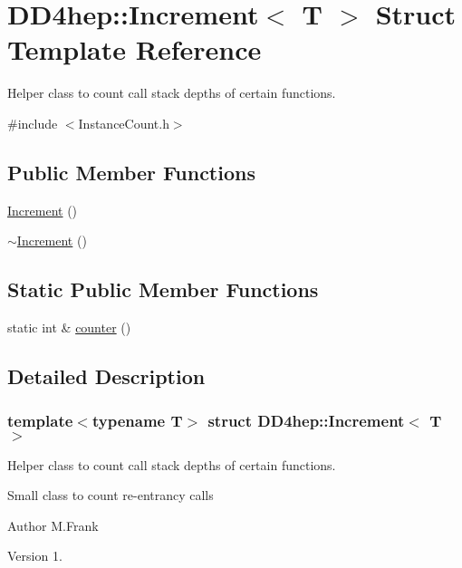 \hypertarget{struct_d_d4hep_1_1_increment}{}\section{D\+D4hep\+:\+:Increment$<$ T $>$ Struct Template Reference}
\label{struct_d_d4hep_1_1_increment}


Helper class to count call stack depths of certain functions.  




{\ttfamily \#include $<$Instance\+Count.\+h$>$}

\subsection*{Public Member Functions}
\begin{DoxyCompactItemize}
\item 
\hyperlink{struct_d_d4hep_1_1_increment_a50a4d78633dc0e8b3eca298c9e09bbb8}{Increment} ()
\item 
\hyperlink{struct_d_d4hep_1_1_increment_ad2148abb952e3dbd20b46c081851affc}{$\sim$\+Increment} ()
\end{DoxyCompactItemize}
\subsection*{Static Public Member Functions}
\begin{DoxyCompactItemize}
\item 
static int \& \hyperlink{struct_d_d4hep_1_1_increment_afac4a87bcf31df0fb0053a61ec800048}{counter} ()
\end{DoxyCompactItemize}


\subsection{Detailed Description}
\subsubsection*{template$<$typename T$>$\newline
struct D\+D4hep\+::\+Increment$<$ T $>$}

Helper class to count call stack depths of certain functions. 

Small class to count re-\/entrancy calls

\begin{DoxyAuthor}{Author}
M.\+Frank 
\end{DoxyAuthor}
\begin{DoxyVersion}{Version}
1. 
\end{DoxyVersion}


